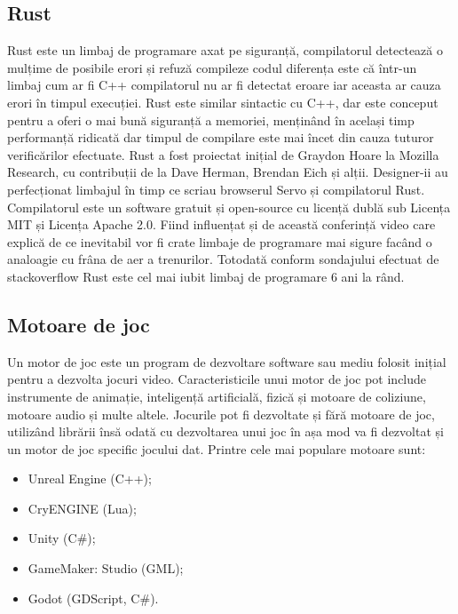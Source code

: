 \subsection{Rust}
Rust \cite{Rust} este un limbaj de programare axat pe siguranță, compilatorul detectează o mulțime de posibile erori și refuză compileze codul diferența este că într-un limbaj cum ar fi C++ compilatorul nu ar fi detectat eroare iar aceasta ar cauza erori în timpul execuției.
Rust este similar sintactic cu C++, dar este conceput pentru a oferi o mai bună siguranță a memoriei, menținând în același timp performanță ridicată dar timpul de compilare este mai încet din cauza tuturor verificărilor efectuate.
Rust a fost proiectat inițial de Graydon Hoare la Mozilla Research, cu contribuții de la Dave Herman, Brendan Eich și alții. Designer-ii au perfecționat limbajul în timp ce scriau browserul Servo și compilatorul Rust. Compilatorul este un software gratuit și open-source cu licență dublă sub Licența MIT și Licența Apache 2.0.
Fiind influențat și de această conferință video \cite{Rust40} care explică de ce inevitabil vor fi crate limbaje de programare mai sigure facând o analoagie cu frâna de aer a trenurilor. Totodată conform sondajului efectuat de stackoverflow \cite{LovedRust} Rust este cel mai iubit limbaj de programare 6 ani la rând.

\subsection{Motoare de joc}
Un motor de joc este un program de dezvoltare software sau mediu folosit inițial pentru a dezvolta jocuri video. Caracteristicile unui motor de joc pot include instrumente de animație, inteligență artificială, fizică și motoare de coliziune, motoare audio și multe altele.
Jocurile pot fi dezvoltate și fără motoare de joc, utilizând librării însă odată cu dezvoltarea unui joc în așa mod va fi dezvoltat și un motor de joc specific jocului dat.
Printre cele mai populare motoare sunt:
\begin{itemize}
    \item Unreal Engine (C++);
    \item CryENGINE (Lua);
    \item Unity (C\#);
    \item GameMaker: Studio (GML);
    \item Godot (GDScript, C\#).
\end{itemize}

